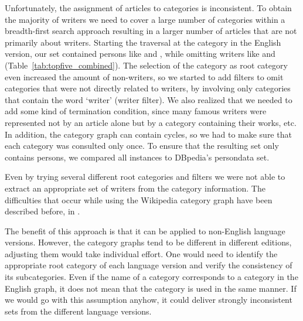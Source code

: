 \documentclass[a4paper,12pt]{scrartcl}
\begin{document}
Unfortunately, the assignment of articles to categories is
inconsistent. To obtain the majority of writers we need to cover a
large number of categories within a breadth-first search approach
resulting in a larger number of articles that are not primarily about
writers. 
%
Starting the traversal at the  category in
the English version, our set contained persons like  and , 
while omitting writers like  and  (Table~\ref{tab:topfive_combined}).
%
The selection of the  category as root category even
increased the amount of non-writers, so we started to add filters to
omit categories that were not directly related to writers, \eg by
involving only categories that contain the word `writer'
(writer filter).
We also realized that we needed to add some kind of termination
condition, since many famous writers were represented not by an
article alone but by a category containing their works, etc.  In
addition, the category graph can contain cycles, so we had to make
sure that each category was consulted only once. To ensure that the
resulting set only contains persons, we compared all instances to
DBpedia's persondata set.

Even by trying several different root categories and filters we were
not able to extract an appropriate set of writers from the category
information.
%
The difficulties that occur while using the Wikipedia category graph
have been described before, \eg in \cite{Medelyan2009Mining}.

The benefit of this approach is that it can be applied to
non-English language versions. However, the category graphs
tend to be different in different editions, adjusting them would
take individual effort. One would need to identify the appropriate
root category of each language version and verify the
consistency of its subcategories. Even if the name of a category
corresponds to a category in the English graph, it does not mean
that the category is used in the same manner. If we would go with
this assumption anyhow, it could deliver strongly inconsistent sets
from the different language versions.
\end{document}
